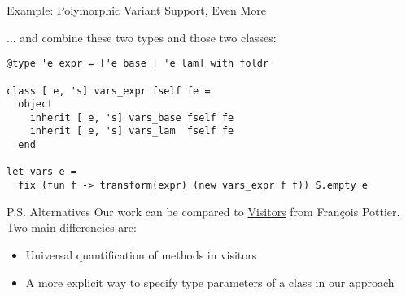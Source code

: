 \documentclass{beamer}
\theoremstyle{definition}
\theoremstyle{plain} %
\begin{document}
\begin{frame}[fragile]{Example: Polymorphic Variant Support, Even More}

... and combine these two types and those two classes:
\vskip4mm
  
\begin{lstlisting}
@type 'e expr = ['e base | 'e lam] with foldr

class ['e, 's] vars_expr fself fe =
  object
    inherit ['e, 's] vars_base fself fe
    inherit ['e, 's] vars_lam  fself fe
  end
                                              
let vars e =
  fix (fun f -> transform(expr) (new vars_expr f f)) S.empty e
\end{lstlisting}

\end{frame}


\begin{comment}
  Our final example is not for children. We are going to implement an html-based navigation through OCaml compiler IR tree,
  providing a way to navigate from identifiers to their binding poistions. We need a typed representation for this purpose,
  and this representation is comprised of 60 mutually-recursive types.
  Here we import the representation of types from corresponding interface files and generate our generic decorations, including
  a transformation for generating html (yes, we already have one). This time we use \lstinline|ppxlib| version of our
  framework. The problem so far is that we can generate html, ok, but there will be no cross-references. The solution, as always,
  is to take this useless transformation and forge a useful one on its basis. In short, we have to redefine its
  behavior in two places: in a binding position and in a referencing position.
\end{comment}



\begin{comment}
Our library is rather similar to `visitors` library that is being used in so-called 
`polymorphic mode`. Two main differencies are 1) universal quantification of methods in `visitors` and 2) more explicit manner to specify type parameters of a class
\end{comment}

\begin{frame}[fragile]{P.S. Alternatives}
Our work can be compared to \href{https://gitlab.inria.fr/fpottier/visitors}{Visitors} from Fran\c cois Pottier. Two main differencies are:
\begin{itemize}
 \item Universal quantification of methods in visitors
 \item A more explicit way to specify type parameters of a class in our approach
\end{itemize}
\end{frame}
\end{document}
